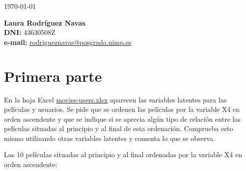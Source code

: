 \documentclass{uimppracticas}
\begin{document}
	
\frontmatter


\begin{center}
\large \today
\end{center}

\vspace{40mm}

\begin{flushright}
 	{\bf Laura Rodríguez Navas}\\
 	\textbf{DNI:} 43630508Z\\
 	\textbf{e-mail:} \href{rodrigueznavas@posgrado.uimp.es}{rodrigueznavas@posgrado.uimp.es}
\end{flushright}

\newpage



\mainmatter

\setlength\parskip{2.5ex}

\section*{Primera parte}

En la hoja Excel \href{https://poliformat.upv.es/access/content/group/ESP_0_2827/movies-users.xlsx}{movies-users.xlsx} aparecen las variables latentes para las películas y usuarios. Se pide que se ordenen las películas por la variable X4 en orden ascendente y que se indique si se aprecia algún tipo de relación entre las películas situadas al principio y al final de esta ordenación. Comprueba esto mismo utilizando otras variables latentes y comenta lo que se observa.

Las 10 películas situadas al principio y al final ordenadas por la variable X4 en orden ascendente:
\end{document}
